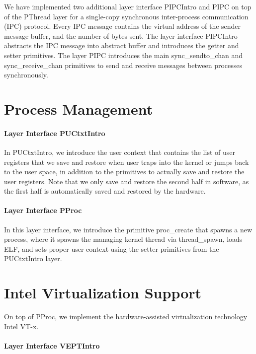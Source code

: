 We have implemented two additional layer interface PIPCIntro and PIPC on top of the PThread layer for a single-copy
synchronous inter-process communication (IPC) protocol. 
Every IPC message contains the virtual address of the sender message buffer, and the number of bytes sent.
The layer interface PIPCIntro abstracts the IPC message into abstract buffer and introduces the getter and setter primitives.
The layer PIPC introduces the main \textsf{sync\_sendto\_chan} and \textsf{sync\_receive\_chan} primitives to send and receive
messages between processes synchronously. 

\section{Process Management}

\paragraph{Layer Interface PUCtxtIntro}

In PUCtxtIntro, we introduce the user context that contains the list of user registers that we save
and restore when user traps into the kernel or jumps back to the user space, in addition to
the primitives to actually save and restore the user registers. Note that we only save and restore the second
half in software, as the first half is automatically saved and restored by the hardware.

\paragraph{Layer Interface PProc}

In this layer interface, we introduce the primitive \textsf{proc\_create} that spawns a new process,
where it spawns the managing kernel thread via \textsf{thread\_spawn}, loads ELF, and sets proper
user context using the setter primitives from the PUCtxtIntro layer.

\section{Intel Virtualization Support}

On top of PProc, we implement the hardware-assisted virtualization technology Intel VT-x.

\paragraph{Layer Interface VEPTIntro}

